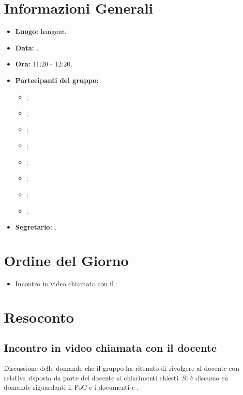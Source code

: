 \section{Informazioni Generali}
\begin{itemize}
	\item \textbf{Luogo:} hangout.
	\item \textbf{Data:} \Data.
	\item \textbf{Ora:} 11:20 - 12:20.
	\item \textbf{Partecipanti del gruppo:}
	\begin{itemize}
		\item \AT{};
		\item \BR{};  
		\item \CE{}; 
		\item \DF{};
		\item \LD{};
		\item \MC{};
		\item \PF{};
		\item \SE{};
	\end{itemize} 
	\item \textbf{Segretario:} \PF{}.
\end{itemize}

\section{Ordine del Giorno}
\begin{itemize}
	\item Incontro in video chiamata con il \VT{};
\end{itemize}

\section{Resoconto}

\subsection{Incontro in video chiamata con il docente}
Discussione delle domande che il gruppo ha ritenuto di rivolgere al docente con relativa risposta da parte del docente ai chiarimenti chiesti. Si è discusso su domande riguardanti il PoC e i documenti \NdP e \PdP.

\clearpage